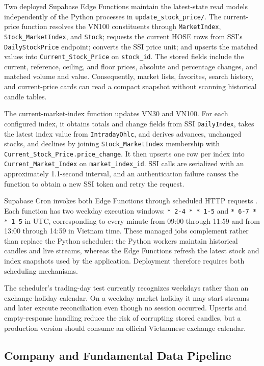 Two deployed Supabase Edge Functions maintain the latest-state read models independently of the Python processes in \texttt{update\_stock\_price/}. The current-price function resolves the VN100 constituents through \texttt{MarketIndex}, \texttt{Stock\_MarketIndex}, and \texttt{Stock}; requests the current HOSE rows from SSI's \texttt{DailyStockPrice} endpoint; converts the SSI price unit; and upserts the matched values into \texttt{Current\_Stock\_Price} on \texttt{stock\_id}. The stored fields include the current, reference, ceiling, and floor prices, absolute and percentage changes, and matched volume and value. Consequently, market lists, favorites, search history, and current-price cards can read a compact snapshot without scanning historical candle tables.

The current-market-index function updates VN30 and VN100. For each configured index, it obtains totals and change fields from SSI \texttt{DailyIndex}, takes the latest index value from \texttt{IntradayOhlc}, and derives advances, unchanged stocks, and declines by joining \texttt{Stock\_MarketIndex} membership with \texttt{Current\_Stock\_Price.price\_change}. It then upserts one row per index into \texttt{Current\_Market\_Index} on \texttt{market\_index\_id}. SSI calls are serialized with an approximately 1.1-second interval, and an authentication failure causes the function to obtain a new SSI token and retry the request.

Supabase Cron invokes both Edge Functions through scheduled HTTP requests \cite{supabaseCron2026}. Each function has two weekday execution windows: \texttt{* 2-4 * * 1-5} and \texttt{* 6-7 * * 1-5} in UTC, corresponding to every minute from 09:00 through 11:59 and from 13:00 through 14:59 in Vietnam time. These managed jobs complement rather than replace the Python scheduler: the Python workers maintain historical candles and live streams, whereas the Edge Functions refresh the latest stock and index snapshots used by the application. Deployment therefore requires both scheduling mechanisms.

The scheduler's trading-day test currently recognizes weekdays rather than an exchange-holiday calendar. On a weekday market holiday it may start streams and later execute reconciliation even though no session occurred. Upserts and empty-response handling reduce the risk of corrupting stored candles, but a production version should consume an official Vietnamese exchange calendar.

\subsection{Company and Fundamental Data Pipeline}
\label{subsec:company-fundamental-pipeline}

